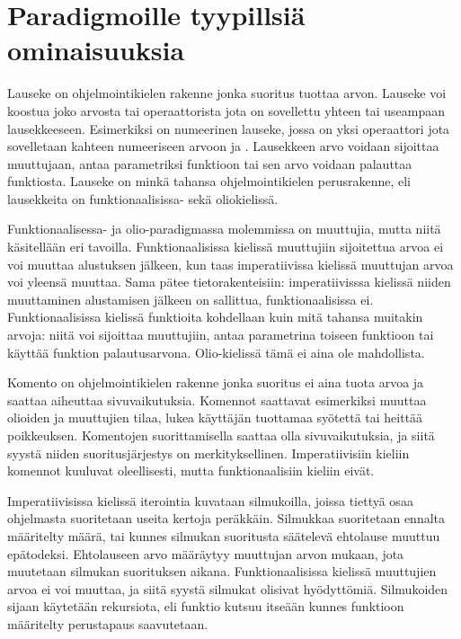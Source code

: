 \section{Paradigmoille tyypillsiä ominaisuuksia}
Lauseke on ohjelmointikielen rakenne jonka suoritus tuottaa arvon. Lauseke voi koostua joko arvosta tai operaattorista jota on sovellettu yhteen tai useampaan lausekkeeseen. Esimerkiksi  on numeerinen lauseke, jossa on yksi operaattori \code{+} jota sovelletaan kahteen numeeriseen arvoon  ja . Lausekkeen arvo voidaan sijoittaa muuttujaan, antaa parametriksi funktioon tai sen arvo voidaan palauttaa funktiosta. Lauseke on minkä tahansa ohjelmointikielen perusrakenne, eli lausekkeita on funktionaalisissa- sekä oliokielissä.
\cite[Luku 6]{principlesAndParadigms}

Funktionaalisessa- ja olio-paradigmassa molemmissa on muuttujia, mutta niitä käsitellään eri tavoilla. Funktionaalisissa kielissä muuttujiin sijoitettua arvoa ei voi muuttaa alustuksen jälkeen, kun taas imperatiivissa kielissä muuttujan arvoa voi yleensä muuttaa. Sama pätee tietorakenteisiin: imperatiivisssa kielissä niiden muuttaminen alustamisen jälkeen on sallittua, funktionaalisissa ei. \cite[Luku 3]{functionalProgrammingInScala} Funktionaalisissa kielissä funktioita kohdellaan kuin mitä tahansa muitakin arvoja: niitä voi sijoittaa muuttujiin, antaa parametrina toiseen funktioon tai käyttää funktion palautusarvona. Olio-kielissä tämä ei aina ole mahdollista.
\cite[Luku 6]{principlesAndParadigms}

Komento on ohjelmointikielen rakenne jonka suoritus ei aina tuota arvoa ja saattaa aiheuttaa sivuvaikutuksia. Komennot saattavat esimerkiksi muuttaa olioiden ja muuttujien tilaa, lukea käyttäjän tuottamaa syötettä tai heittää poikkeuksen. Komentojen suorittamisella saattaa olla sivuvaikutuksia, ja siitä syystä niiden suoritusjärjestys on merkityksellinen. Imperatiivisiin kieliin komennot kuuluvat oleellisesti, mutta funktionaalisiin kieliin eivät.

Imperatiivisissa kielissä iterointia kuvataan silmukoilla, joissa tiettyä osaa ohjelmasta suoritetaan useita kertoja peräkkäin. Silmukkaa suoritetaan ennalta määritelty määrä, tai kunnes silmukan suoritusta säätelevä ehtolause muuttuu epätodeksi. Ehtolauseen arvo määräytyy muuttujan arvon mukaan, jota muutetaan silmukan suorituksen aikana. Funktionaalisissa kielissä muuttujien arvoa ei voi muuttaa, ja siitä syystä silmukat olisivat hyödyttömiä. Silmukoiden sijaan käytetään rekursiota, eli funktio kutsuu itseään kunnes funktioon määritelty perustapaus saavutetaan.
\cite[Luku 6 ja 11]{principlesAndParadigms}
